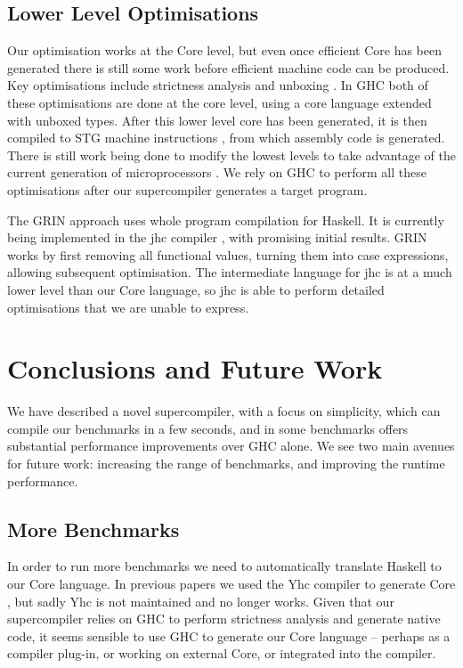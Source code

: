 \documentclass[draft]{sigplanconf}
\begin{document}
\subsection{Lower Level Optimisations}

Our optimisation works at the Core level, but even once efficient Core has been generated there is still some work before efficient machine code can be produced. Key optimisations include strictness analysis and unboxing \cite{spj:unboxing}. In GHC both of these optimisations are done at the core level, using a core language extended with unboxed types. After this lower level core has been generated, it is then compiled to STG machine instructions \cite{spj:stg}, from which assembly code is generated. There is still work being done to modify the lowest levels to take advantage of the current generation of microprocessors \cite{marlow:pointer_tagging}. We rely on GHC to perform all these optimisations after our supercompiler generates a target program.

The GRIN approach \cite{grin} uses whole program compilation for Haskell. It is currently being implemented in the jhc compiler \cite{jhc}, with promising initial results. GRIN works by first removing all functional values, turning them into case expressions, allowing subsequent optimisation. The intermediate language for jhc is at a much lower level than our Core language, so jhc is able to perform detailed optimisations that we are unable to express.

\section{Conclusions and Future Work}

We have described a novel supercompiler, with a focus on simplicity, which can compile our benchmarks in a few seconds, and in some benchmarks offers substantial performance improvements over GHC alone. We see two main avenues for future work: increasing the range of benchmarks, and improving the runtime performance.

\subsection{More Benchmarks}

In order to run more benchmarks we need to automatically translate Haskell to our Core language. In previous papers we used the Yhc compiler to generate Core \cite{me:yhc_core}, but sadly Yhc is not maintained and no longer works. Given that our supercompiler relies on GHC to perform strictness analysis and generate native code, it seems sensible to use GHC to generate our Core language -- perhaps as a compiler plug-in, or working on external Core, or integrated into the compiler.
\end{document}
